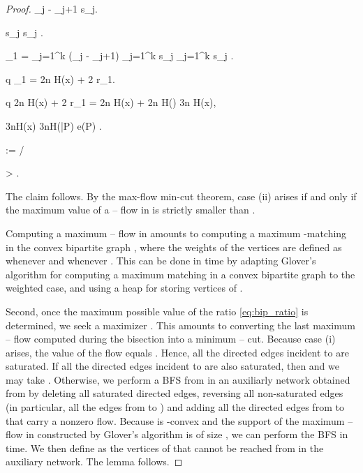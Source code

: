\documentclass{article} \usepackage{fullpage}
\newcommand{\ent}{H}
\begin{document}
\begin{proof}
\label{eq:delta_phi}
\phi_{j} - \phi_{j+1}
\geq s_{j}\log {}.

\label{eqn:onemerge}
s_{j} \log {} \geq {} s_{j} \log {}.

\phi_{1} = \sum_{j=1}^{k} (\phi_{j} - \phi_{j+1})
\geq \sum_{j=1}^{k}  s_{j} \log {}
\geq \sum_{j=1}^{k}  s_{j} \log {} 
\geq {}.

q \phi_{1} = 2n \ent(x) + 2 r_{1}.

q \leq 2n \ent(x) + 2 r_{1} = 2n \ent(x) + 2n \ent() \leq 3n \ent(x),

3n\ent (x) \leq 3n\ent(\bar{P}) \log e(P) .

\rho := \beta / \alpha

 > \frac{\beta}{\alpha}.

The claim follows. By the max-flow min-cut theorem, case (ii) arises if and only if the maximum value of a -- flow in  is strictly smaller than . 

Computing a maximum -- flow in  amounts to computing a maximum -matching in the convex bipartite graph , where the weights of the vertices are defined as  whenever  and  whenever . This can be done in  time by adapting Glover's algorithm for computing a maximum matching in a convex bipartite graph \cite{G67} to the weighted case, and using a heap for storing vertices of . 

Second, once the maximum possible value of the ratio \eqref{eq:bip_ratio} is determined, we seek a maximizer . This amounts to converting the last maximum -- flow computed during the bisection into a minimum -- cut. Because case (i) arises, the value of the flow equals . Hence, all the directed edges incident to  are saturated. If all the directed edges incident to  are also saturated, then  and we may take . Otherwise, we perform a BFS from  in an auxiliarly network obtained from  by deleting all saturated directed edges, reversing all non-saturated edges (in particular, all the edges from  to ) and adding all the directed edges  from  to  that carry a nonzero flow. Because  is -convex and the support of the maximum -- flow in  constructed by Glover's algorithm is of size , we can perform the BFS in  time. We then define  as the vertices of  that cannot be reached from  in the auxiliary network. The lemma follows.
\end{proof}
\end{document}
